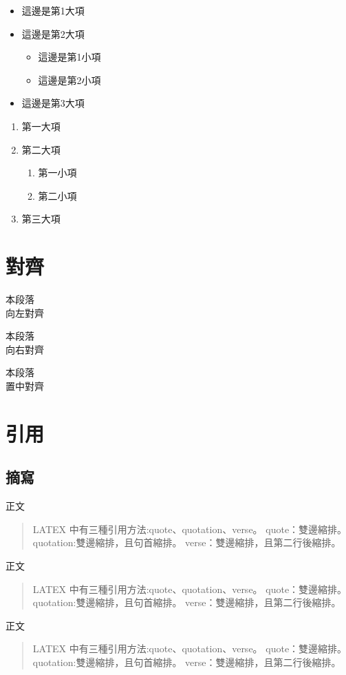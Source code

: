 \begin{itemize}
    \item 這邊是第1大項
    \item 這邊是第2大項
          \begin{itemize}
              \item 這邊是第1小項
              \item 這邊是第2小項
          \end{itemize}
    \item 這邊是第3大項
\end{itemize}

\begin{enumerate}[1]
    \item 第一大項
    \item 第二大項
          \begin{enumerate}
              \item 第一小項
              \item 第二小項
          \end{enumerate}
    \item 第三大項
\end{enumerate}

\newpage

\section{對齊}
\begin{flushleft}
    本段落\\
    向左對齊
\end{flushleft}

\begin{flushright}
    本段落\\
    向右對齊
\end{flushright}

\begin{center}
    本段落\\
    置中對齊
\end{center}

\section{引用}
\subsection{摘寫}\label{ssec_qute}
正文
\begin{quote}
    LATEX 中有三種引用方法:quote、quotation、verse。
    quote：雙邊縮排。
    quotation:雙邊縮排，且句首縮排。
    verse：雙邊縮排，且第二行後縮排。
\end{quote}
正文
\begin{quotation}
    LATEX 中有三種引用方法:quote、quotation、verse。
    quote：雙邊縮排。
    quotation:雙邊縮排，且句首縮排。
    verse：雙邊縮排，且第二行後縮排。
\end{quotation}
正文
\begin{verse}
    LATEX 中有三種引用方法:quote、quotation、verse。
    quote：雙邊縮排。
    quotation:雙邊縮排，且句首縮排。
    verse：雙邊縮排，且第二行後縮排。
\end{verse}

